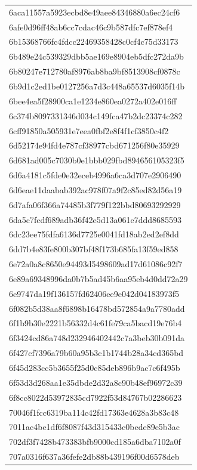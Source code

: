 \begin{tabular}{l}
6aca11557a5923ecbd8e49aee84346880a6ec24cf6 \\
6afe0d96ff48ab6cc7cdac46c9b587dfc7ef878ef4 \\
6b15368766fc4fdcc22469358428c0cf4c75d33173 \\
6b489e24c539329dbb5ae169e8904eb5dfc272da9b \\
6b80247e712780af8976ab8ba9bf8513908cf0878c \\
6b9d1c2ed1be0127256a7d3c448a65537d6035f14b \\
6bee4ea5f28900ca1e1234e860ea0272a402e016ff \\
6c374b8097331346d034c149fca47b2dc23374c282 \\
6cff91850a505931e7eea0fbf2e8f4f1cf3850c4f2 \\
6d52174e94fd4e787cf38977cbd671256f80e35929 \\
6d681ad005c7030b0e1bbb029fbd894656105323f5 \\
6d6a4181c5fde0e32eceb4996a6ca3d707e2906490 \\
6d6eae11daabab392ac978f07a9f2c85ed82d56a19 \\
6d7afa06f366a74485b3f779f122bbd80693292929 \\
6da5c7fcdf689adb36f42e5d13a061e7ddd8685593 \\
6dc23ee75fdfa6136d7725e0041fd18ab2ed2ef8dd \\
6dd7b4e83fe800b307bf48f173b685fa13f59ed858 \\
6e72a0a8c8650e94493d5498609ad17d61086c92f7 \\
6e89a69348996da0b7b5ad45b6aa95eb4d0dd72a29 \\
6e9747da19f136157fd62406ee9e042d04183973f5 \\
6f082b5d38aa8f6898b16478bd572854a9a7780add \\
6f1b9b30e2221b56332d4c61fe79ca5bacd19e76b4 \\
6f3424cd86a748d232946402442c7a3beb30b091da \\
6f427cf7396a79b60a95b3c1b1744b28a34cd365bd \\
6f45d283cc5b3655f25d0c85deb896b9ac7c6f495b \\
6f53d3d268aa1e35dbde2d32a8c90b48ef96972c39 \\
6f8cc8022d53972835cd7922f53d84767b02286623 \\
70046f1fcc6319ba114c42fd17363e4628a3b83c48 \\
7011ac4be1df6f8087f43d315433c0bede89e5b3ac \\
702df3f7428b473383bfb9000cd185a6dba7102a0f \\
707a0316f637a36fefe2db88b439196f00d6578deb \\

\end{tabular}

